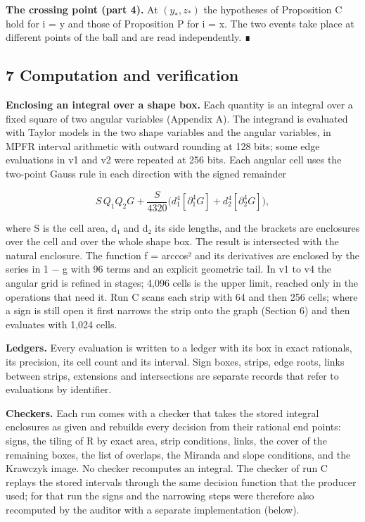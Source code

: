 \documentclass[
  11pt,
]{article}
\begin{document}
\textbf{The crossing point (part 4).} At \((y_*, z_*)\) the hypotheses
of Proposition C hold for i = y and those of Proposition P for i = x.
The two events take place at different points of the ball and are read
independently. ∎

\subsection{7 Computation and verification}

\textbf{Enclosing an integral over a shape box.} Each quantity is an
integral over a fixed square of two angular variables (Appendix A). The
integrand is evaluated with Taylor models in the two shape variables and
the angular variables, in MPFR interval arithmetic with outward rounding
at 128 bits; some edge evaluations in v1 and v2 were repeated at 256
bits. Each angular cell uses the two-point Gauss rule in each direction
with the signed remainder

\[
S\,Q_1Q_2G+\frac{S}{4320}\bigl(d_1^4[\partial_1^4G]+d_2^4[\partial_2^4G]\bigr),
\]

where S is the cell area, d₁ and d₂ its side lengths, and the brackets
are enclosures over the cell and over the whole shape box. The result is
intersected with the natural enclosure. The function f = arccos² and its
derivatives are enclosed by the series in 1 − g with 96 terms and an
explicit geometric tail. In v1 to v4 the angular grid is refined in
stages; 4,096 cells is the upper limit, reached only in the operations
that need it. Run C scans each strip with 64 and then 256 cells; where a
sign is still open it first narrows the strip onto the graph (Section 6)
and then evaluates with 1,024 cells.

\textbf{Ledgers.} Every evaluation is written to a ledger with its box
in exact rationals, its precision, its cell count and its interval. Sign
boxes, strips, edge roots, links between strips, extensions and
intersections are separate records that refer to evaluations by
identifier.

\textbf{Checkers.} Each run comes with a checker that takes the stored
integral enclosures as given and rebuilds every decision from their
rational end points: signs, the tiling of R by exact area, strip
conditions, links, the cover of the remaining boxes, the list of
overlaps, the Miranda and slope conditions, and the Krawczyk image. No
checker recomputes an integral. The checker of run C replays the stored
intervals through the same decision function that the producer used; for
that run the signs and the narrowing steps were therefore also
recomputed by the auditor with a separate implementation (below).
\end{document}
